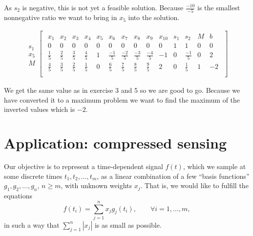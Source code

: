 \documentclass[10pt,a4paper]{article}
\theoremstyle{plain}
\theoremstyle{definition}
\begin{document}
\begin{enumerate}
As $s_2$ is negative, this is not yet a feasible solution. Because $\frac{-10}{-5}$ is the smallest nonnegative ratio we want to bring in $x_5$ into the solution.

\begin{align*}
  \begin{array}{c}
    \\ 
    s_1 \\
    x_5 \\ 
    M
    \end{array}
    \begin{bmatrix}
    \begin{array}{ccccccccccccc|c}
      x_1 & x_2 & x_3 & x_4 & x_5 & x_6 & x_7 & x_8 & x_9 & x_{10} & s_1 & s_2 & M & b \\ \hline
      0 & 0 & 0 & 0 & 0 & 0 & 0 & 0 & 0 & 0 & 1 & 1 & 0 & 0 \\
      \frac{1}{5} & \frac{2}{5} & \frac{3}{5} & \frac{4}{5} & 1 & \frac{-1}{5} & \frac{-2}{5} & \frac{-3}{5} & \frac{-4}{5} & -1 & 0 & \frac{-1}{5} & 0 & 2 \\ \hline
      \frac{4}{5} & \frac{3}{5} & \frac{2}{5} & \frac{1}{5} & 0 & \frac{6}{5} & \frac{7}{5} & \frac{8}{5} & \frac{9}{5} & 2 & 0 & \frac{1}{5} & 1 & -2 \\
    \end{array}
  \end{bmatrix}
\end{align*}

We get the same value as in exercise 3 and 5 so we are good to go. Because we have converted it to a maximum problem we want to find the maximum of the inverted values which is $-2$.
\end{enumerate}


\section*{Application: compressed sensing}

Our objective is to represent a time-dependent signal \(f(t)\), which we sample at some discrete times \(t_1, t_2, \dots, t_m\), as a linear combination of a few ``basis functions'' \(g_1, g_2, \dots, g_n\), \(n\geq m\),
with unknown weights \(x_j\).
That is, we would like to fulfill the equations
\[
  f(t_i) = \sum_{j=1}^n x_j g_j(t_i), \qquad \forall i=1,\dots,m,
\]
in such a way that \(\sum_{j=1}^n |x_j|\) is as small as possible.
\end{document}
